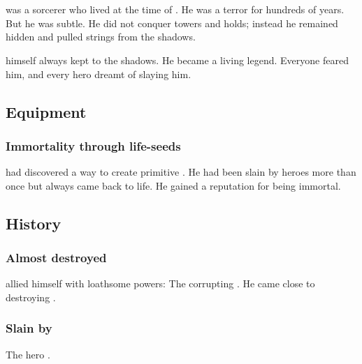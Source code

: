 \section{\Sartheron}
\index{\Sartheron}
\Sartheron was a \resphan sorcerer who lived at the time of \Merkyrah. 
He was a terror for hundreds of years.
But he was subtle.
He did not conquer towers and holds; instead he remained hidden and pulled strings from the shadows.

\Sartheron himself always kept to the shadows.
He became a living legend. 
Everyone feared him, and every hero dreamt of slaying him. 





\subsection{Equipment}





\subsubsection{Immortality through life-seeds}
\Sartheron had discovered a way to create primitive . 
He had been slain by heroes more than once but always came back to life.
He gained a reputation for being immortal. 











\subsection{History}





\subsubsection{Almost destroyed \Merkyrah}
\Sartheron allied himself with loathsome powers: The corrupting . 
He came close to destroying \Merkyrah.





\subsubsection{Slain by \Netzach}
The hero \Netzach {}.









